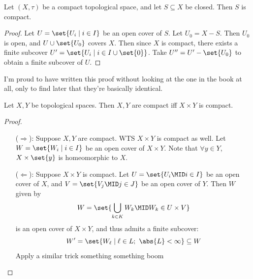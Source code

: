 \documentclass{fkbook}
\begin{document}
\begin{adjustwidth}{1em}{1em}
  \begin{theorem}
    Let $(X, \tau)$ be a compact topological space, and let $S
    \subseteq X$ be closed. Then $S$ is compact.
  \end{theorem}
  \begin{proof}
    Let $U = \set{U_i \mid i \in I}$ be an open cover of $S$. Let $U_0
    = X - S$. Then $U_0$ is open, and $U \cup \set{U_0}$ covers $X$.
    Then since $X$ is compact, there exists a finite subcover $U' =
    \set{U_i \mid i \in I \cup \set{0}}$. Take $U'' = U' - \set{U_0}$
    to obtain a finite subcover of $U$.
  \end{proof}
  I'm proud to have written this proof without looking at the one in
  the book at all, only to find later that they're basically
  identical.
  \begin{theorem}
    Let $X, Y$ be topological spaces. Then $X, Y$ are compact iff $X
    \times Y$ is compact.
  \end{theorem}
  \begin{proof}~
    \begin{enumerate}
      \item[($\Rightarrow$):] Suppose $X,Y$ are compact. WTS $X \times
        Y$ is compact as well. Let $W = \set{W_i \mid i \in I}$ be an
        open cover of $X \times Y$. Note that $\forall y \in Y$, $X
        \times \set{y}$ is homeomorphic to $X$.
      \item[($\Leftarrow$):] Suppose $X \times Y$ is compact. Let $U =
        \set{U_i \MID i \in I}$ be an open cover of $X$, and $V =
        \set{V_j \MID j \in J}$ be an open cover of $Y$. Then $W$
        given by
        \[
          W = \set{\bigcup_{k \in K} W_k \MID W_k \in U \times V}
        \]
        is an open cover of $X \times Y$, and thus admits a finite
        subcover:
        \[
          W' = \set{W_\ell \mid \ell \in L;\ \abs{L} < \infty}
          \subseteq W
        \]
        Apply a similar trick something something boom
    \end{enumerate}
  \end{proof}

\end{adjustwidth}
\end{document}
